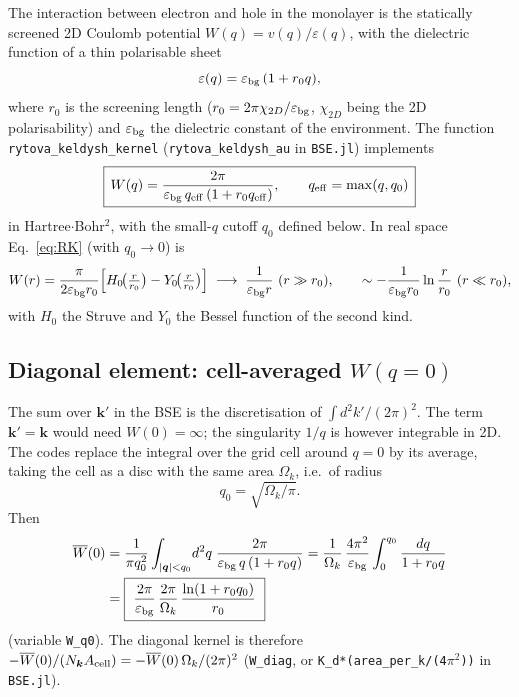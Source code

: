 \documentclass[11pt,a4paper]{article}
\newcommand{\kk}{\bm{k}}
\newcommand{\qq}{\bm{q}}
\newcommand{\code}[1]{\texttt{#1}}
\newcommand{\Acell}{A_{\rm cell}}
\newcommand{\Nk}{N_{\bm k}}
\newcommand{\Wbar}{\overline{W}(0)}
\begin{document}
The interaction between electron and hole in the monolayer is the statically screened 2D Coulomb potential
$W(q)=v(q)/\varepsilon(q)$, with the dielectric function of a thin polarisable sheet
\begin{equation}
\varepsilon(q)=\varepsilon_{\rm bg}\,(1+r_0 q),
\end{equation}
where $r_0$ is the screening length ($r_0=2\pi\chi_{2D}/\varepsilon_{\rm bg}$, $\chi_{2D}$ being the 2D polarisability) and $\varepsilon_{\rm bg}$ the dielectric constant of the environment.
The function \code{rytova\_keldysh\_kernel} (\code{rytova\_keldysh\_au} in \code{BSE.jl}) implements
\begin{equation}
\boxed{\,W(q)=\frac{2\pi}{\varepsilon_{\rm bg}\,q_{\rm eff}\,(1+r_0 q_{\rm eff})},\qquad q_{\rm eff}=\max(q,q_0)\,}
\label{eq:RK}
\end{equation}
in Hartree$\cdot$Bohr$^2$, with the small-$q$ cutoff $q_0$ defined below. In real space Eq.~\eqref{eq:RK} (with $q_0\to0$) is
\begin{equation}
W(r)=\frac{\pi}{2\varepsilon_{\rm bg}r_0}\Big[H_0\!\big(\tfrac{r}{r_0}\big)-Y_0\!\big(\tfrac{r}{r_0}\big)\Big]
\;\longrightarrow\;\frac{1}{\varepsilon_{\rm bg}r}\ (r\gg r_0),\qquad
\sim-\frac{1}{\varepsilon_{\rm bg}r_0}\ln\frac{r}{r_0}\ (r\ll r_0),
\end{equation}
with $H_0$ the Struve and $Y_0$ the Bessel function of the second kind.

\subsection{Diagonal element: cell-averaged $W(q=0)$}
The sum over $\kk'$ in the BSE is the discretisation of $\int d^2k'/(2\pi)^2$. The term $\kk'=\kk$ would need $W(0)=\infty$; the singularity $1/q$ is however integrable in 2D. The codes replace the integral over the grid cell around $q=0$ by its average, taking the cell as a disc with the same area $\Omega_k$, i.e.\ of radius
\begin{equation}
q_0=\sqrt{\Omega_k/\pi}.
\end{equation}
Then
\begin{align}
\Wbar&=\frac{1}{\pi q_0^2}\int_{|\qq|<q_0}\! d^2q\;\frac{2\pi}{\varepsilon_{\rm bg}\,q\,(1+r_0q)}
=\frac{1}{\Omega_k}\,\frac{4\pi^2}{\varepsilon_{\rm bg}}\int_0^{q_0}\frac{dq}{1+r_0q}\nonumber\\
&=\boxed{\ \frac{2\pi}{\varepsilon_{\rm bg}}\,\frac{2\pi}{\Omega_k}\,\frac{\ln(1+r_0q_0)}{r_0}\ }
\label{eq:Wbar}
\end{align}
(variable \code{W\_q0}). The diagonal kernel is therefore $-\Wbar/(\Nk\Acell)=-\Wbar\,\Omega_k/(2\pi)^2$ (\code{W\_diag}, or \code{K\_d*(area\_per\_k/(4$\pi^2$))} in \code{BSE.jl}).
\end{document}
